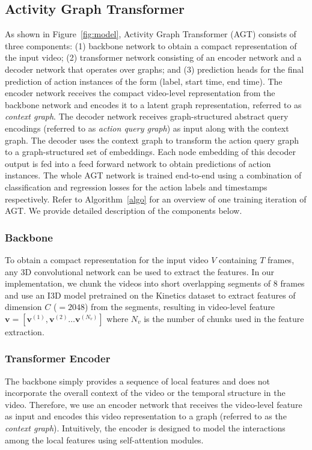 \documentclass[10pt,twocolumn,letterpaper]{article}
\begin{document}
\subsection{Activity Graph Transformer}
As shown in Figure~\ref{fig:model}, Activity Graph Transformer (AGT) consists of three components: (1) backbone network to obtain a compact representation of the input video; (2) transformer network consisting of an encoder network and a decoder network that operates over graphs; and (3) prediction heads for the final prediction of action instances of the form (label, start time, end time). The encoder network receives the compact video-level representation from the backbone network and encodes it to a latent graph representation, referred to as \textit{context graph}. The decoder network receives graph-structured abstract query encodings (referred to as \textit{action query graph}) as input along with the context graph. The decoder uses the context graph to transform the action query graph to a graph-structured set of embeddings.
Each node embedding of this decoder output is fed into a feed forward network to obtain predictions of action instances. The whole AGT network is trained end-to-end using a combination of classification and regression losses for the action labels and timestamps respectively. Refer to Algorithm~\ref{algo} for an overview of one training iteration of AGT. We provide detailed description of the components below. 


\subsubsection{Backbone} \label{subsec:backbone}
To obtain a compact representation for the input video $V$ containing $T$ frames, any 3D convolutional network can be used to extract the features. In our implementation, we chunk the videos into short overlapping segments of 8 frames and use an I3D model pretrained on the Kinetics\cite{carreira2017quo} dataset to extract features of dimension $C$ ($=2048$) from the segments, resulting in video-level feature $\mathbf{v} = [\mathbf{v}^{(1)},\mathbf{v}^{(2)} \ldots \mathbf{v}^{(N_v)}]$ where $N_v$ is the number of chunks used in the feature extraction. 

\subsubsection{Transformer Encoder}\label{subsec:encoder}
The backbone simply provides a sequence of local features and does not incorporate the overall context of the video or the temporal structure in the video. Therefore, we use an encoder network that receives the video-level feature as input and encodes this video representation to a graph (referred to as the \textit{context graph}). Intuitively, the encoder is designed to model the interactions among the local features using self-attention modules. 
\end{document}
